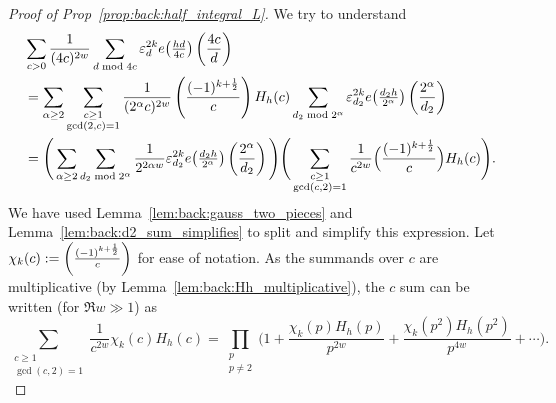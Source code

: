 \begin{proof}[Proof of Prop~\ref{prop:back:half_integral_L}]

  We try to understand
  \begin{align}
    &\sum_{c > 0} \frac{1}{(4c)^{2w}} \sum_{d \bmod 4c} \varepsilon_d^{2k}
    e \big( \tfrac{hd}{4c} \big) \left(\frac{4c}{d}\right)
    \\
    &= \sum_{\alpha \geq 2} \sum_{\substack{c \geq 1 \\ \gcd(2,c) = 1}}
    \frac{1}{(2^\alpha c)^{2w}} \left(\frac{(-1)^{k + \frac{1}{2}}}{c}\right) H_h(c)
    \sum_{d_2 \bmod 2^\alpha} \varepsilon_{d_2}^{2k}
    e \big( \tfrac{d_2 h}{2^\alpha} \big) \left(\frac{2^\alpha}{d_2}\right)
    \\
    &= \Bigg( \sum_{\alpha \geq 2} \sum_{d_2 \bmod 2^\alpha}
      \frac{1}{2^{2\alpha w}} \varepsilon_{d_2}^{2k} e \big( \tfrac{d_2 h}{2^\alpha} \big)
      \left(\frac{2^\alpha}{d_2}\right)
    \Bigg)
    \Bigg( \sum_{\substack{c \geq 1 \\ \gcd(c,2) = 1}}
      \frac{1}{c^{2w}}
      \Big(\frac{(-1)^{k + \frac{1}{2}}}{c}\Big) H_h(c)
    \Bigg). \label{eq:back:Lprop_proof_I}
  \end{align}
  We have used Lemma~\ref{lem:back:gauss_two_pieces} and
  Lemma~\ref{lem:back:d2_sum_simplifies} to split and simplify this expression.
  Let $\chi_k(c) := \left(\frac{(-1)^{k + \frac{1}{2}}}{c}\right)$ for ease of notation.
  As the summands over $c$ are multiplicative (by Lemma~\ref{lem:back:Hh_multiplicative}),
  the $c$ sum can be written (for $\Re w \gg 1$) as
  \begin{equation}
    \sum_{\substack{c \geq 1 \\ \gcd(c,2) = 1}}
    \frac{1}{c^{2w}} \chi_k(c) H_h(c)
    =
    \prod_{\substack{p \\ p \neq 2}} \Big( 1 + \frac{\chi_k(p) H_h(p)}{p^{2w}} +
    \frac{\chi_k(p^2) H_h(p^2)}{p^{4w}} + \cdots  \Big).
  \end{equation}



\end{proof}
